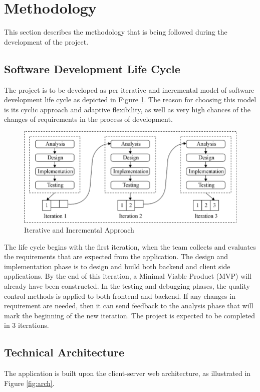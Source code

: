 \documentclass[12pt, a4paper, oneside]{article}
\begin{document}
\pagebreak
\section{ Methodology }
This section describes the methodology that is  being followed during the development of the project.

\subsection{ Software Development Life Cycle}
The project is to be developed as per iterative and incremental model of software development life cycle as depicted in Figure \ref{fig:sdlc}. The reason for choosing this model is its cyclic approach and adaptive flexibility, as well as very high chances of the changes of requirements in the process of development. 

\begin{figure}[h]
	\includegraphics[width=\linewidth]{sdlc}
	\centering
	\caption{ Iterative and Incremental Approach }
	\label{fig:sdlc}
\end{figure}

The life cycle begins with the first iteration, when the team collects and evaluates the requirements that are expected from the application. The design and\\ implementation phase is to design and build both backend and client side applications. By the end of this iteration, a Minimal Viable Product (MVP) will already have been constructed. In the testing and debugging phases, the quality control methods is applied to both frontend and backend. If any changes in requirement are needed, then it can send feedback to the analysis phase that will mark the beginning of the new iteration. The project is expected to be completed in 3 iterations.
 
\pagebreak
\subsection{Technical Architecture}
The application is built upon the client-server web architecture, as illustrated in Figure \ref{fig:arch}.
\end{document}
